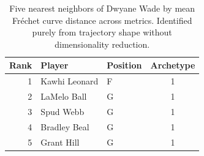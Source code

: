 \begin{table}[htbp]
  \centering\small
  \begin{tabular}{rllc}
    \toprule
    Rank & Player & Position & Archetype \\
    \midrule
    1 & Kawhi Leonard & F & 1 \\
    2 & LaMelo Ball & G & 1 \\
    3 & Spud Webb & G & 1 \\
    4 & Bradley Beal & G & 1 \\
    5 & Grant Hill & G & 1 \\
    \bottomrule
  \end{tabular}
  \caption{Five nearest neighbors of Dwyane Wade by mean Fr\'{e}chet curve distance across metrics. Identified purely from trajectory shape without dimensionality reduction.}
  \label{tab:Dwyane_Wade_frechet_curve_neighbors}
\end{table}

